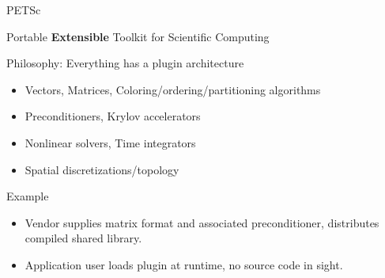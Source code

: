 \begin{frame}{PETSc}

\begin{center}Portable {\bf Extensible} Toolkit for Scientific Computing \end{center}

\begin{block}{Philosophy: Everything has a plugin architecture}
\begin{itemize}
  \item Vectors, Matrices, Coloring/ordering/partitioning algorithms
  \item Preconditioners, Krylov accelerators
  \item Nonlinear solvers, Time integrators
  \item Spatial discretizations/topology
\end{itemize}
\end{block}


\begin{block}{Example}
  \begin{itemize}
   \item Vendor supplies matrix format and associated preconditioner, distributes
	compiled shared library.  
   \item Application user loads plugin at runtime, no source
	code in sight.
  \end{itemize}
\end{block}

\vspace{2cm}
\end{frame}


